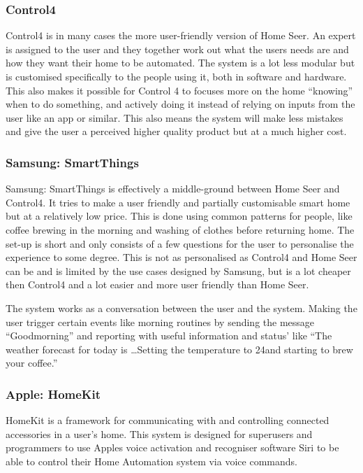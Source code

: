 \subsubsection{Control4}
Control4 is in many cases the more user-friendly version of Home Seer. An expert is assigned to the user and they together work out what the users needs are and how they want their home to be automated. The system is a lot less modular but is customised specifically to the people using it, both in software and hardware. This also makes it possible for Control 4 to focuses more on the home \enquote{knowing} when to do something, and actively doing it instead of relying on inputs from the user like an app or similar. This also means the system will make less mistakes and give the user a perceived higher quality product but at a much higher cost.%

\subsubsection{Samsung: SmartThings}
Samsung: SmartThings is effectively a middle-ground between Home Seer and Control4. It tries to make a user friendly and partially customisable smart home but at a relatively low price. This is done using common patterns for people, like coffee brewing in the morning and washing of clothes before returning home. The set-up is short and only consists of a few questions for the user to personalise the experience to some degree. This is not as personalised as Control4 and Home Seer can be and is limited by the use cases designed by Samsung, but is a lot cheaper then Control4 and a lot easier and more user friendly than Home Seer.

The system works as a conversation between the user and the system. Making the user trigger certain events like morning routines by sending the message \enquote{Goodmorning} and reporting with useful information and status' like \enquote{The weather forecast for today is \dots Setting the temperature to 24\degree and starting to brew your coffee.}

\subsubsection{Apple: HomeKit}
HomeKit is a framework for communicating with and controlling connected accessories in a user's home. %
This system is designed for superusers and programmers to use Apples voice activation and recogniser software Siri to be able to control their Home Automation system via voice commands.

